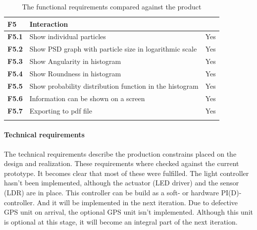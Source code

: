 \documentclass[11pt,fleqn,,a4paper,twoside,openright]{book}
\begin{document}
\begin{longtable}{|p{1cm}| p{9cm} p{2.5cm}|}
	\hline 
	\textbf{F5}\label{F5} & \textbf{Interaction} &  \\ 
	\hline 
	\textbf{F5.1}\label{F5.1} & Show individual particles  & Yes \\ 
	\hline 
	\textbf{F5.2}\label{F5.2} & Show PSD graph with particle size in logarithmic scale  & Yes  \\ 
	\hline 
	\textbf{F5.3}\label{F5.3} & Show Angularity in histogram  & Yes \\ 
	\hline 
	\textbf{F5.4}\label{F5.4} & Show Roundness in histogram & Yes \\ 
	\hline 
	\textbf{F5.5}\label{F5.5} & Show probability distribution function in the histogram & Yes \\ 
	\hline 
	\textbf{F5.6}\label{F5.6} & Information can be shown on a screen & Yes \\
	\hline 
	\textbf{F5.7}\label{F5.7} & Exporting to pdf file & Yes \\
	\hline 
	\caption{The functional requirements compared against the product}\label{tab:FuncReqCompaire}
\end{longtable} 

\newpage
\paragraph{Technical requirements}
The technical requirements describe the production constrains placed on the design and realization. These requirements where checked against the current prototype. It becomes clear that most of these were fulfilled. The light controller hasn't been implemented, although the actuator (LED driver) and the sensor (LDR) are in place. This controller can be build as a soft- or hardware PI(D)-controller. And it will be implemented in the next iteration.
Due to defective GPS unit on arrival, the optional GPS unit isn't implemented. Although this unit is optional at this stage, it will become an integral part of the next iteration.
\end{document}
